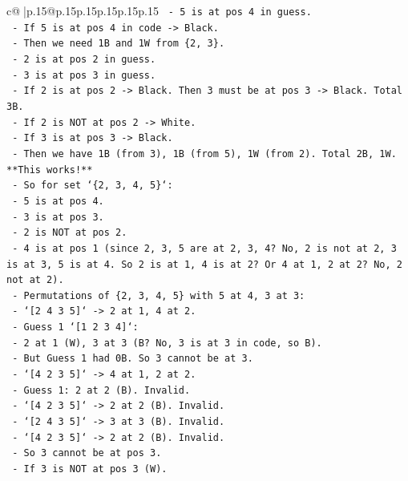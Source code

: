 \documentclass{article}
\begin{document}
{\begin{supertabular}{c@{$\;$}|p{.15\linewidth}@{}p{.15\linewidth}p{.15\linewidth}p{.15\linewidth}p{.15\linewidth}p{.15\linewidth}}
{{{\texttt{  {-} 5 is at pos 4 in guess.} \\
\texttt{  {-} If 5 is at pos 4 in code {-}> Black.} \\
\texttt{  {-} Then we need 1B and 1W from \{2, 3\}.} \\
\texttt{  {-} 2 is at pos 2 in guess.} \\
\texttt{  {-} 3 is at pos 3 in guess.} \\
\texttt{  {-} If 2 is at pos 2 {-}> Black. Then 3 must be at pos 3 {-}> Black. Total 3B.} \\
\texttt{  {-} If 2 is NOT at pos 2 {-}> White.} \\
\texttt{  {-} If 3 is at pos 3 {-}> Black.} \\
\texttt{  {-} Then we have 1B (from 3), 1B (from 5), 1W (from 2). Total 2B, 1W. **This works!**} \\
\texttt{  {-} So for set `\{2, 3, 4, 5\}`:} \\
\texttt{    {-} 5 is at pos 4.} \\
\texttt{    {-} 3 is at pos 3.} \\
\texttt{    {-} 2 is NOT at pos 2.} \\
\texttt{    {-} 4 is at pos 1 (since 2, 3, 5 are at 2, 3, 4? No, 2 is not at 2, 3 is at 3, 5 is at 4. So 2 is at 1, 4 is at 2? Or 4 at 1, 2 at 2? No, 2 not at 2).} \\
\texttt{    {-} Permutations of \{2, 3, 4, 5\} with 5 at 4, 3 at 3:} \\
\texttt{      {-} `{[}2 4 3 5{]}` {-}> 2 at 1, 4 at 2.} \\
\texttt{        {-} Guess 1 `{[}1 2 3 4{]}`:} \\
\texttt{          {-} 2 at 1 (W), 3 at 3 (B? No, 3 is at 3 in code, so B).} \\
\texttt{          {-} But Guess 1 had 0B. So 3 cannot be at 3.} \\
\texttt{      {-} `{[}4 2 3 5{]}` {-}> 4 at 1, 2 at 2.} \\
\texttt{        {-} Guess 1: 2 at 2 (B). Invalid.} \\
\texttt{      {-} `{[}4 2 3 5{]}` {-}> 2 at 2 (B). Invalid.} \\
\texttt{      {-} `{[}2 4 3 5{]}` {-}> 3 at 3 (B). Invalid.} \\
\texttt{      {-} `{[}4 2 3 5{]}` {-}> 2 at 2 (B). Invalid.} \\
\texttt{    {-} So 3 cannot be at pos 3.} \\
\texttt{    {-} If 3 is NOT at pos 3 (W).} \\
}}}
\end{supertabular}}
\end{document}
